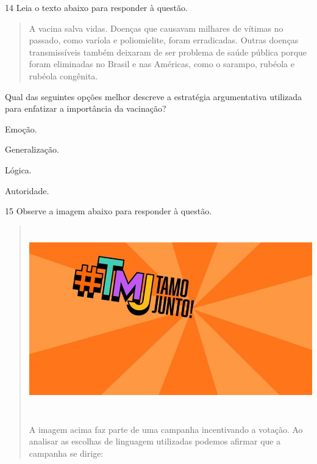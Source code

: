 \num{14} Leia o texto abaixo para responder à questão. 

\begin{quote}

A vacina salva vidas. Doenças que causavam milhares de vítimas no
passado, como varíola e poliomielite, foram erradicadas. Outras doenças
transmissíveis também deixaram de ser problema de saúde pública porque
foram eliminadas no Brasil e nas Américas, como o sarampo, rubéola e
rubéola congênita.

\end{quote}


Qual das seguintes opções melhor descreve a estratégia argumentativa
utilizada para enfatizar a importância da vacinação?

\begin{escolha}

    \item Emoção.
    
    \item Generalização.
    
    \item Lógica.
    
    \item Autoridade.

\end{escolha}

\num{15} Observe a imagem abaixo para responder à questão. 

\begin{quote}

\includegraphics[width=5.90551in,height=3.18056in]{imgSAEB_7_POR/media/image22.png}


A imagem acima faz parte de uma campanha incentivando a votação. Ao analisar
as escolhas de linguagem utilizadas podemos afirmar que a campanha se dirige: 

\end{quote}

